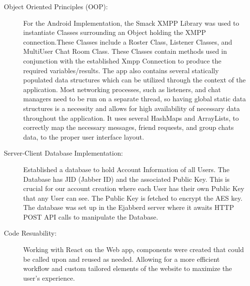 \documentclass[12pt]{article}
\begin{document}
\begin{description}
    \item [Object Oriented Principles (OOP):]  For the Android Implementation, the Smack XMPP Library was used to instantiate Classes surrounding an Object holding the XMPP connection.These Classes include a Roster Class, Listener Classes, and MultiUser Chat Room Class. These Classes contain methods used in conjunction with the established Xmpp Connection to produce the required variables/results. The app also contains several statically populated data structures which can be utilized through the context of the application. Most networking processes, such as listeners, and chat managers need to be run on a separate thread, so having global static data structures is a necessity and allows for high availability of necessary data throughout the application. It uses several HashMaps and ArrayLists, to correctly map the necessary messages, friend requests, and group chats data, to the proper user interface layout.

    \item [Server-Client Database Implementation:] Established a database to hold Account Information of all Users. The Database has JID (Jabber ID) and the associated Public Key. This is crucial for our account creation where each User has their own Public Key that any User can see. The Public Key is fetched to encrypt the AES key. The database was set up in the Ejabberd server where it awaits HTTP POST API calls to manipulate the Database. 
    \item [Code Resuability:]  Working with React on the Web app, components were created that could be called upon and reused as needed. Allowing for a more efficient workflow and custom tailored elements of the website to maximize the user’s experience.
\end{description}
\end{document}
